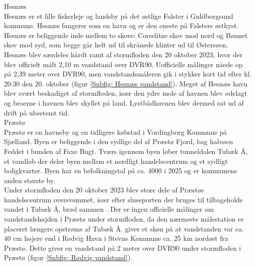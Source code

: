 {\large Hesnæs}\\
Hesnæs er et lille fiskerleje og landsby på det østlige Falster i Guldborgsund kommune. Hesnæs fungerer som en havn og er den eneste på Falsters østkyst. Hesnæs er beliggende inde mellem to skove: Corselitze skov mod nord og Bønnet skov mod syd, som begge går helt ud til skrånede klinter ud til Østersøen. \\
Hesnæs blev særdeles hårdt ramt af stormfloden den 20 oktober 2023, hvor der blev officielt målt 2,10 m vandstand over DVR90. Uofficielle målinger nåede op på 2,39 meter over DVR90, men vandstandsmåleren gik i stykker kort tid efter kl. 20:30 den 20. oktober (figur \ref{Subfig: Hesnæs vandstand}). Meget af Hesnæs havn blev svært beskadiget af stormfloden, især den ydre mole af havnen blev ødelagt og broerne i havnen blev skyllet på land. Lystbådhavnen blev dermed sat ud af drift på ubestemt tid. \\

{\large Præstø}\\
Præstø er en havneby og en tidligere købstad i Vordingborg Kommune på Sjælland. Byen er beliggende i den sydlige del af Præstø Fjord, bag halvøen Feddet i bunden af Faxe Bugt. Tværs igennem byen løber tunneldalen Tubæk Å, et vandløb der deler byen mellem et nordligt handelscentrum og et sydligt boligkvarter. Byen har en befolkningstal på ca. 4000 i 2025 \citep{danmarks_statistisk_mobile_nodate} og er kommunens anden største by. \\
Under stormfloden den 20 oktober 2023 blev store dele af Præstøs handelscentrum oversvømmet, især efter sluseporten der bruges til tilbageholde vandet i Tubæk Å, brød sammen \citep{uldall_sluseport_2023}. Der er ingen officielle målinger om vandstandshøjden i Præstø under stormfloden, da den nærmeste målestation er placeret længere opstrøms af Tubæk Å. \cite{cowi_praesto_2025} giver et skøn på at vandstanden var ca. 40 cm højere end i Rødvig Havn i Stevns Kommune ca. 25 km nordøst fra Præstø. Dette giver en vandstand på 2 meter over DVR90 under stormfloden i Præstø (figur \ref{Subfig: Rødvig vandstand}).

